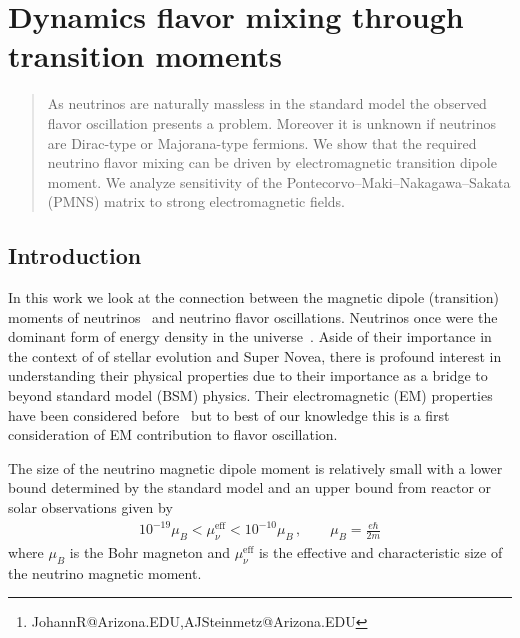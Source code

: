 \documentclass[addchapnum]{ws-rv961x669} %
\begin{document}
\chapter[Dynamics flavor mixing through transition moments]{Dynamics flavor mixing through transition moments\label{JR_ch1}}

\author[J. Rafelski and A. Steinmetz]{Johann Rafelski and Andrew Steinmetz\footnote{JohannR@Arizona.EDU,AJSteinmetz@Arizona.EDU}}

\address{Department of Physics, The University of Arizona, Tucson, AZ 85721, USA}

\begin{abstract} 
As neutrinos are naturally massless in the standard model the observed flavor oscillation presents a problem. Moreover it is unknown if neutrinos are Dirac-type or Majorana-type fermions. We show that the required neutrino flavor mixing can be driven by electromagnetic transition dipole moment. We  analyze sensitivity of the Pontecorvo–Maki–Nakagawa–Sakata (PMNS) matrix to strong electromagnetic fields.
\end{abstract}


\body


\section{Introduction}
\label{sec:intro}
\noindent 
In this work we look at the connection between the magnetic dipole (transition) moments of neutrinos~\cite{Shrock:1980vy} and neutrino flavor oscillations. Neutrinos once were the dominant form of energy density in the universe~\cite{Rafelski:2023emw}. Aside of their importance in the context of  of stellar evolution and Super Novea, there is profound interest in understanding their physical properties due to their importance as a bridge to beyond standard model (BSM) physics. Their electromagnetic (EM) properties have been considered before~\cite{Giunti:2014ixa} but to best of our knowledge this is a first consideration of EM contribution to flavor oscillation.  

The size of the neutrino magnetic dipole moment is relatively small with a lower bound determined by the standard model and an upper bound from reactor or solar observations given by~\citep{Studenikin:2016ykv,Canas:2015yoa,AristizabalSierra:2021fuc}
\begin{align}
    \label{momentbound:1}
    10^{-19}\mu_{B}<\mu_{\nu}^\mathrm{eff}<10^{-10}\mu_{B}\,,\qquad\mu_{B}=\frac{e\hbar}{2m}
\end{align}
where $\mu_{B}$ is the Bohr magneton and $\mu_{\nu}^\mathrm{eff}$ is the effective and characteristic size of the neutrino magnetic moment.
\end{document}
